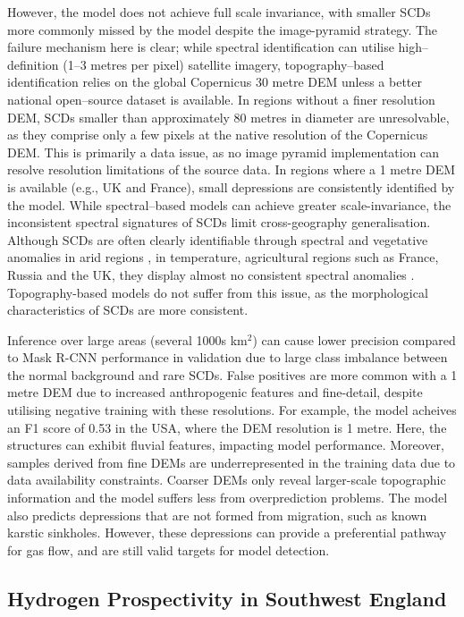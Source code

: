 \documentclass[12pt]{article}
\begin{document}
However, the model does not achieve full scale invariance, with smaller SCDs more commonly missed by the model despite the image-pyramid strategy. The failure mechanism here is clear; while spectral identification can utilise high--definition (1--3 metres per pixel) satellite imagery, topography--based identification relies on the global Copernicus 30 metre DEM unless a better national open--source dataset is available. In regions without a finer resolution DEM, SCDs smaller than approximately 80 metres in diameter are unresolvable, as they comprise only a few pixels at the native resolution of the Copernicus DEM. This is primarily a data issue, as no image pyramid implementation can resolve resolution limitations of the source data. In regions where a 1 metre DEM is available (e.g., UK and France), small depressions are consistently identified by the model. While spectral--based models can achieve greater scale-invariance, the inconsistent spectral signatures of SCDs limit cross-geography generalisation. Although SCDs are often clearly identifiable through spectral and vegetative anomalies in arid regions \cite{Brazil, MORETTI202235588, Morrocco}, in temperature, agricultural regions such as France, Russia and the UK, they display almost no consistent spectral anomalies \cite{Russia}. Topography-based models do not suffer from this issue, as the morphological characteristics of SCDs are more consistent.

Inference over large areas (several 1000s km$^2$) can cause lower precision compared to Mask R-CNN performance in validation due to large class imbalance between the normal background and rare SCDs. False positives are more common with a 1 metre DEM due to increased anthropogenic features and fine-detail, despite utilising negative training with these resolutions. For example, the model acheives an F1 score of 0.53 in the USA, where the DEM resolution is 1 metre. Here, the structures can exhibit fluvial features, impacting model performance. Moreover, samples derived from fine DEMs are underrepresented in the training data due to data availability constraints. Coarser DEMs only reveal larger-scale topographic information and the model suffers less from overprediction problems. The model also predicts depressions that are not formed from  migration, such as known karstic sinkholes. However, these depressions can provide a preferential pathway for gas flow, and are still valid targets for model detection.

\subsection{Hydrogen Prospectivity in Southwest England}
\end{document}
